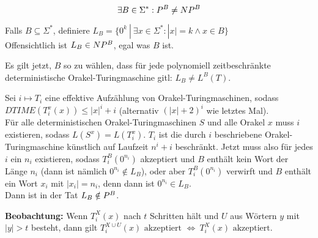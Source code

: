 \begin{satz}
    
    $$ \exists B \in \Sigma^\ast: P^B \neq NP^B $$

\end{satz}

\begin{beweis}
    
    Falls $B \subseteq \Sigma^\ast$, 
    definiere $L_B = \{  0^k \ |\   \exists x \in \Sigma^\ast: |x| = k \land x \in B  \} $ \\
    Offensichtlich ist $L_B \in NP^B$, egal was $B$ ist.

    Es gilt jetzt, $B$ so zu wählen, dass für jede polynomiell zeitbeschränkte deterministische Orakel-Turingmaschine gitl: $L_B \neq L^B(T)$.

    Sei $i \mapsto T_i$ eine effektive Aufzählung von Orakel-Turingmaschinen, sodass $DTIME(T_i^x(x)) \leq |x|^i + i$ (alternativ $(|x| + 2)^i$ wie letztes Mal).\\
    Für alle deterministischen Orakel-Turingmaschinen $S$ und alle Orakel $x$ muss $i$ existieren, sodass $L(S^x) = L(T_i^x)$. $T_i$ ist die durch $i$ beschriebene Orakel-Turingmaschine künstlich auf Laufzeit $n^i + i$ beschränkt. Jetzt muss also für jedes $i$ ein $n_i$ existieren, sodass $T_i^B(0^{n_i})$ akzeptiert und $B$ enthält kein Wort der Länge $n_i$ (dann ist nämlich $0^{n_i} \notin L_B$), oder aber $T_i^B(0^{n_i})$ verwirft und $B$ enthält ein Wort $x_i$ mit $|x_i| = n_i$, denn dann ist $0^{n_i} \in L_B$.\\
    Dann ist in der Tat $L_B \notin P^B$.

    \textbf{Beobachtung:}
    Wenn $T_i^X(x)$ nach $t$ Schritten hält und $U$ aus Wörtern $y$ mit $|y| > t$ besteht, dann gilt 
    $T_i^{X \cup U}(x) \text{ akzeptiert }  \Leftrightarrow  \ T_i^X(x) \text{ akzeptiert}$.

    
\end{beweis}




